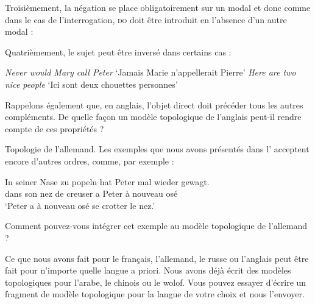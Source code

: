 {    \begin{exe}
    \begin{xlista}
    \end{xlista}
    \end{exe}
    
    Troisièmement, la négation se place obligatoirement sur un modal et donc comme dans le cas de l’interrogation, \textsc{do} doit être introduit en l’absence d’un autre modal :
    
    \begin{exe}
    \begin{xlista}
    \end{xlista}
    \end{exe}

    Quatrièmement, le sujet peut être inversé dans certains cas :
    
    \begin{exe}
    \begin{xlista}
    \ex  \textit{Never would Mary call Peter}   ‘Jamais Marie n’appellerait Pierre’
    \ex  \textit{Here are two nice people}     ‘Ici sont deux chouettes personnes’
    \end{xlista}
    \end{exe}
    Rappelons également que, en anglais, l’objet direct doit précéder tous les autres compléments. De quelle façon un modèle topologique de l’anglais peut-il rendre compte de ces propriétés ?

     Topologie de l’allemand. Les exemples que nous avons présentés dans l’ acceptent encore d’autres ordres, comme, par exemple :

    \begin{exe}
    \gll In seiner Nase zu popeln hat Peter mal wieder gewagt.\\
         dans son nez  de creuser  a   Peter   à nouveau   osé\\
    \glt   ‘Peter a à nouveau osé se crotter le nez.’
    \end{exe}

    Comment pouvez-vous intégrer cet exemple au modèle topologique de l’allemand ?

     Ce que nous avons fait pour le français, l’allemand, le russe ou l’anglais peut être fait pour n’importe quelle langue a priori. Nous avons déjà écrit des modèles topologiques pour l’arabe, le chinois ou le wolof. Vous pouvez essayer d’écrire un fragment de modèle topologique pour la langue de votre choix et nous l’envoyer.
}
